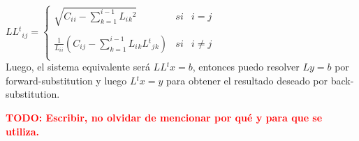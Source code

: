 $LL{^t}{_i}{_j} =
\left\{
	\begin{array}{lcc}
		\sqrt{C{_i}{_i} - \sum\limits_{k=1}^{i-1} L{_i}{_k}^2} & si & i = j \\
		\\ \frac{1}{L{_i}{_i}}(C{_i}{_j} - \sum\limits_{k=1}^{i-1} L{_i}{_k}L{^t}{_j}{_k}) & si & i \neq j \\
	\end{array}
\right.$ \\

Luego, el sistema equivalente ser\'a $LL{^t}x = b$, entonces puedo resolver $Ly = b$ por forward-substitution y luego $L{^t}x = y$ para obtener el resultado deseado por back-substitution.

\textcolor{red}{\textbf{TODO: Escribir, no olvidar de mencionar por qu\'e y para que se utiliza.}}